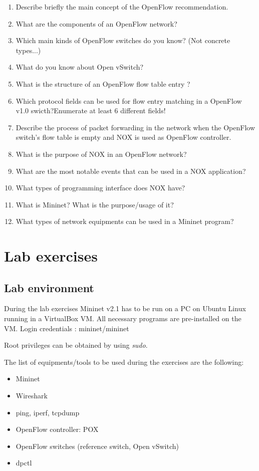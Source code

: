 \documentclass[a4paper]{article}
\begin{document}
\begin{enumerate}
    \item Describe briefly the main concept of the OpenFlow recommendation.
    \item What are the components of an OpenFlow network?
    \item Which main kinds of OpenFlow switches do you know? (Not concrete types...)
    \item What do you know about Open vSwitch?
    \item What is the structure of an OpenFlow flow table entry ?
    \item Which protocol fields can be used for flow entry matching in a OpenFlow v1.0 swicth?Enumerate at least 6
          different fields!
    \item Describe the process of packet forwarding in the network when the OpenFlow switch's flow table is empty and
          NOX is used as OpenFlow controller.
    \item What is the purpose of NOX in an OpenFlow network?
    \item What are the most notable events that can be used in a NOX application?
    \item What types of programming interface does NOX have?
    \item What is Mininet? What is the purpose/usage of it?
    \item What types of network equipments can be used in a Mininet program?
\end{enumerate}

\section{Lab exercises}

\subsection{Lab environment}

During the lab exercises Mininet v2.1 has to be run on a PC on Ubuntu Linux running in a VirtualBox VM. All necessary
programs are pre-installed on the VM.
Login credentials : mininet/mininet

Root privileges can be obtained by using \emph{sudo}.

The list of equipments/tools to be used during the exercises are the following:
\begin{itemize}
    \item Mininet
    \item Wireshark
    \item ping, iperf, tcpdump
    \item OpenFlow controller: POX
    \item OpenFlow switches (reference switch, Open vSwitch)
    \item dpctl
\end{itemize}
\end{document}
